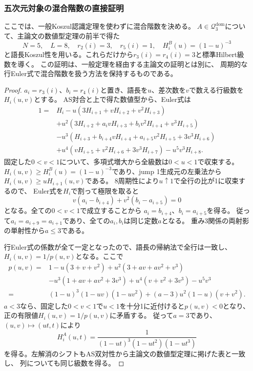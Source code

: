 \documentclass[11pt,a4paper]{ltjsarticle}
\begin{document}
\subsubsection{五次元対象の混合階数の直接証明}
\label{note:n3-direct-mixed-ranks}
ここでは、一般Koszul認識定理を使わずに混合階数を決める。
$A\in\mathcal Q_3^{\mathrm{dom}}$について、主論文の数値型定理の前半で得た
\[
N=5,\quad L=8,\quad r_2(i)=3,\quad r_5(i)=1,\quad
H_i^B(u)=(1-u)^{-3}
\]
と語長Koszul性を用いる。これらだけから$r_3(i)=r_4(i)=3$と標準Hilbert級数を導く。
この証明は、一般定理を経由する主論文の証明とは別に、
周期的な行Euler式で混合階数を扱う方法を保持するものである。
\begin{proof}
$a_i=r_3(i)$、$b_i=r_4(i)$と置き、語長を$u$、差次数を$v$で数える行級数を$H_i(u,v)$とする。
AS対合と上で得た数値型から、Euler式は
\begin{align*}
1={}&H_i-u(3H_{i+1}+vH_{i+2}+v^2H_{i+3})\\
&+u^2(3H_{i+2}+a_i vH_{i+3}+b_i v^2H_{i+4}+v^3H_{i+5})\\
&-u^3(H_{i+3}+b_{i+4}vH_{i+4}+a_{i+5}v^2H_{i+5}+3v^3H_{i+6})\\
&+u^4(vH_{i+5}+v^2H_{i+6}+3v^3H_{i+7})-u^5v^3H_{i+8}.
\end{align*}
固定した$0<v<1$について、多項式増大から全級数は$0<u<1$で収束する。
$H_i(u,v)\geq H_i^B(u)=(1-u)^{-3}$であり、jump 1生成元の左乗法から
$H_i(u,v)\geq uH_{i+1}(u,v)$である。
8周期性により$u\uparrow1$で全行の比が1に収束するので、
Euler式を$H_i$で割って極限を取ると
\[
v(a_i-b_{i+4})+v^2(b_i-a_{i+5})=0
\]
となる。全ての$0<v<1$で成立することから
$a_i=b_{i+4}$、$b_i=a_{i+5}$を得る。
従って$a_i=a_{i+9}=a_{i+1}$であり、全ての$a_i,b_i$は同じ定数$a$となる。
重み3関係の両射影の単射性から$a\leq3$である。

行Euler式の係数が全て一定となったので、語長の帰納法で全行は一致し、
$H_i(u,v)=1/p(u,v)$となる。ここで
\begin{align*}
p(u,v)={}&1-u(3+v+v^2)+u^2(3+av+av^2+v^3)\\
&-u^3(1+av+av^2+3v^3)+u^4(v+v^2+3v^3)-u^5v^3\\
={}&(1-u)^3(1-uv)(1-uv^2)+(a-3)u^2(1-u)(v+v^2).
\end{align*}
$a<3$なら、固定した$0<v<1$で$u<1$を十分1に近付けると$p(u,v)<0$となり、
正の有限値$H_i(u,v)=1/p(u,v)$に矛盾する。
従って$a=3$であり、$(u,v)\mapsto(ut,t)$により
\[
 H_i^A(u,t)=\frac1{(1-ut)^3(1-ut^2)(1-ut^3)}
\]
を得る。左解消のシフトもAS双対性から主論文の数値型定理に掲げた表と一致し、
列についても同じ級数を得る。

\end{proof}
\end{document}
